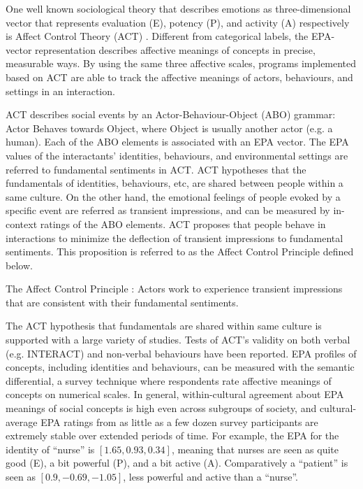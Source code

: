 One well known sociological theory that describes emotions as three-dimensional vector that represents evaluation (E), potency (P), and activity (A) respectively is Affect Control Theory (ACT) \cite{robinson2006affect}. Different from categorical labels, the EPA-vector representation describes affective meanings of concepts in precise, measurable ways. By using the same three affective scales, programs implemented based on ACT are able to track the affective meanings of actors, behaviours, and settings in an interaction.

ACT describes social events by an Actor-Behaviour-Object (ABO) grammar: Actor Behaves towards Object, where Object is usually another actor (e.g. a human). Each of the ABO elements is associated with an EPA vector. The EPA values of the interactants' identities, behaviours, and environmental settings are referred to fundamental sentiments in ACT. ACT hypotheses that the fundamentals of identities, behaviours, etc, are shared between people within a same culture. On the other hand, the emotional feelings of people evoked by a specific event are referred as transient impressions, and can be measured by in-context ratings of the ABO elements. ACT proposes that people behave in interactions to minimize the deflection of transient impressions to fundamental sentiments. This proposition is referred to as the Affect Control Principle defined below.

The Affect Control Principle \cite{robinson2006affect}: Actors work to experience transient impressions that are consistent with their fundamental sentiments. 

The ACT hypothesis that fundamentals are shared within same culture is supported with a large variety of studies. Tests of ACT's validity on both verbal (e.g. INTERACT) and non-verbal behaviours \cite{schroder2013culture} have been reported. EPA profiles of concepts, including identities and behaviours, can be measured with the semantic differential, a survey technique where respondents rate affective meanings of concepts on numerical scales. In general, within-cultural agreement about EPA meanings of social concepts is high even across subgroups of society, and cultural-average EPA ratings from as little as a few dozen survey participants are extremely stable over extended periods of time. For example, the EPA for the identity of ``nurse'' is $[1.65, 0.93, 0.34]$, meaning that nurses are seen as quite good (E), a bit powerful (P), and a bit active (A). Comparatively a ``patient'' is seen as $[0.9, -0.69, -1.05]$, less powerful and active than a ``nurse''.

